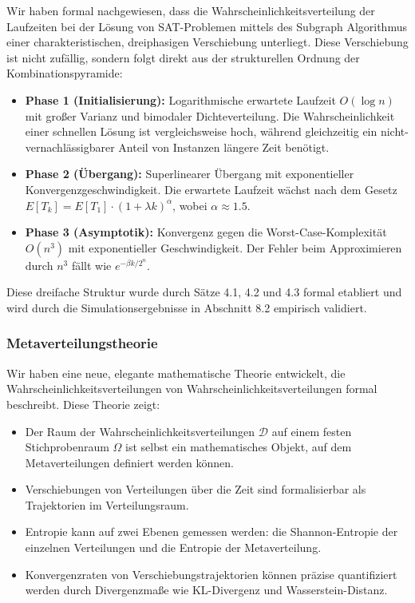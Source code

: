 ﻿\documentclass[a4paper,12pt]{article}
\theoremstyle{definition}
\begin{document}
Wir haben formal nachgewiesen, dass die Wahrscheinlichkeitsverteilung der Laufzeiten bei der Lösung von SAT-Problemen mittels des Subgraph Algorithmus einer charakteristischen, dreiphasigen Verschiebung unterliegt. Diese Verschiebung ist nicht zufällig, sondern folgt direkt aus der strukturellen Ordnung der Kombinationspyramide:

\begin{itemize}
	\item \textbf{Phase 1 (Initialisierung):} Logarithmische erwartete Laufzeit $O(\log n)$ mit großer Varianz und bimodaler Dichteverteilung. Die Wahrscheinlichkeit einer schnellen Lösung ist vergleichsweise hoch, während gleichzeitig ein nicht-vernachlässigbarer Anteil von Instanzen längere Zeit benötigt.
	
	\item \textbf{Phase 2 (Übergang):} Superlinearer Übergang mit exponentieller Konvergenzgeschwindigkeit. Die erwartete Laufzeit wächst nach dem Gesetz $E[T_k] = E[T_1] \cdot (1 + \lambda k)^\alpha$, wobei $\alpha \approx 1.5$.
	
	\item \textbf{Phase 3 (Asymptotik):} Konvergenz gegen die Worst-Case-Komplexität $O(n^3)$ mit exponentieller Geschwindigkeit. Der Fehler beim Approximieren durch $n^3$ fällt wie $e^{-\beta k / 2^n}$.
\end{itemize}

Diese dreifache Struktur wurde durch Sätze 4.1, 4.2 und 4.3 formal etabliert und wird durch die Simulationsergebnisse in Abschnitt 8.2 empirisch validiert.

\subsubsection{Metaverteilungstheorie}

Wir haben eine neue, elegante mathematische Theorie entwickelt, die Wahrscheinlichkeitsverteilungen von Wahrscheinlichkeitsverteilungen formal beschreibt. Diese Theorie zeigt:

\begin{itemize}
	\item Der Raum der Wahrscheinlichkeitsverteilungen $\mathcal{D}$ auf einem festen Stichprobenraum $\Omega$ ist selbst ein mathematisches Objekt, auf dem Metaverteilungen definiert werden können.
	
	\item Verschiebungen von Verteilungen über die Zeit sind formalisierbar als Trajektorien im Verteilungsraum.
	
	\item Entropie kann auf zwei Ebenen gemessen werden: die Shannon-Entropie der einzelnen Verteilungen und die Entropie der Metaverteilung.
	
	\item Konvergenzraten von Verschiebungstrajektorien können präzise quantifiziert werden durch Divergenzmaße wie KL-Divergenz und Wasserstein-Distanz.
\end{itemize}
\end{document}
